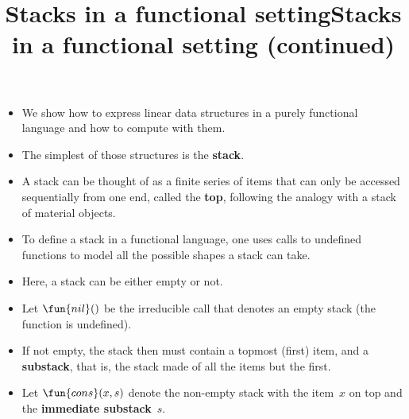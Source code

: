 \documentclass[wide]{slides}
\begin{document}
\begin{slide}
  \title{Stacks in a functional setting}

  \begin{itemize}

    \item We show how to express linear data structures in a purely
      functional language and how to compute with them.

    \item The simplest of those structures is the \textbf{stack}.

    \item A stack can be thought of as a finite series of items that
      can only be accessed sequentially from one end, called the
      \textbf{top}, following the analogy with a stack of material
      objects.

  \end{itemize}

\end{slide}
\begin{slide}
  \title{Stacks in a functional setting (continued)}

  \begin{itemize}

    \item To define a stack in a functional language, one uses calls
      to undefined functions to model all the possible shapes a stack
      can take.

    \item Here, a stack can be either empty or not.

    \item Let \(\fun{nil}()\) be the irreducible call that denotes an
      empty stack (the function  is undefined).

    \item If not empty, the stack then must contain a topmost (first)
      item, and a \textbf{substack}, that is, the stack made of all
      the items but the first.

    \item Let \(\fun{cons}(x,s)\) denote the non\hyp{}empty stack with
      the item~\(x\) on top and the \textbf{immediate substack}~\(s\).

  \end{itemize}

\end{slide}
\end{document}
